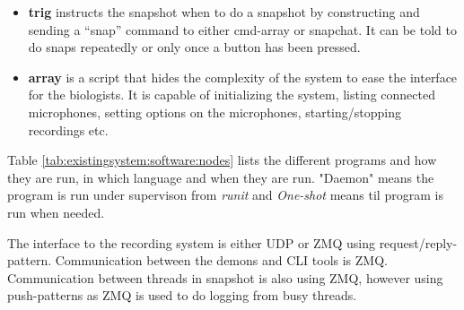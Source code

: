 \begin{itemize}
	
	\item \textbf{trig} instructs the snapshot when to do a snapshot by constructing and sending a “snap” command to either cmd-array or snapchat. It can be told to do snaps repeatedly or only once a button has been pressed.

	\item \textbf{array} is a script that hides the complexity of the system to ease the interface for the biologists. It is capable of initializing the system, listing connected microphones, setting options on the microphones, starting/stopping recordings etc.

\end{itemize}


Table \ref{tab:existingsystem:software:nodes} lists the different programs and how they are run, in which language and when they are run. "Daemon" means the program is run under supervison from \textit{runit} and \textit{One-shot} means til program is run when needed.

\begin{table}[h!]
\centering
{}
\caption{My caption}
\label{my-label}
\end{table}



The interface to the recording system is either UDP or ZMQ using request/reply-pattern. Communication between the demons and CLI tools is ZMQ. Communication between threads in snapshot is also using ZMQ, however using push-patterns as ZMQ is used to do logging from busy threads.

